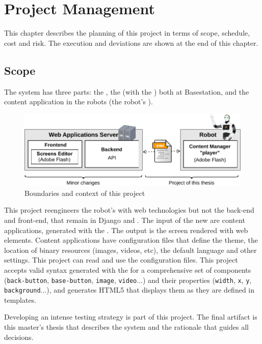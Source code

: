 \chapter{Project Management}
This chapter describes the planning of this project in terms of scope, schedule, cost and risk.
The execution and deviations are shown at the end of this chapter.

\section{Scope}
\label{sec:scope}
The system has three parts: the \flangobe, the \flangofe (with the \se) both at Basestation, and the content application in the robots (the robot's \cm {}).

\begin{figure}[htb]
    \centering
    \includegraphics{figures/intro-system-overview.pdf}
    \caption{Boundaries and context of this project}
    \label{fig:system-overview}
\end{figure}

This project reengineers the robot's \cm with web technologies but not the back-end and front-end, that remain in Django and \flash.
The input of the new \cm are content applications, generated with the \se . The output is the screen rendered with web elements.
Content applications have configuration files that define the theme, the location of binary resources (images, videos, etc), the default language and other settings. 
This project can read and use the configuration files.
This project accepts valid syntax generated with the \se for a comprehensive set of components (\texttt{back-button}, \texttt{base-button}, \texttt{image}, \texttt{video}...) and their properties (\texttt{width}, \texttt{x}, \texttt{y}, \texttt{background}...), and generates \ac{HTML5} that displays them as they are defined in templates.

Developing an intense testing strategy is part of this project.
The final artifact is this master's thesis that describes the system and the rationale that guides all decisions.

